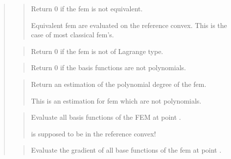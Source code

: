 \documentclass[a4paper,11pt,english]{sphinxmanual}
\begin{document}
\begin{quote}
\sphinxAtStartPar
{}
\begin{quote}

\sphinxAtStartPar
Return 0 if the fem is not equivalent.

\sphinxAtStartPar
Equivalent fem are evaluated on the reference convex. This is
the case of most classical fem’s.
\end{quote}

\sphinxAtStartPar
{}
\begin{quote}

\sphinxAtStartPar
Return 0 if the fem is not of Lagrange type.
\end{quote}

\sphinxAtStartPar
{}
\begin{quote}

\sphinxAtStartPar
Return 0 if the basis functions are not polynomials.
\end{quote}

\sphinxAtStartPar
{}
\begin{quote}

\sphinxAtStartPar
Return an estimation of the polynomial degree of the fem.

\sphinxAtStartPar
This is an estimation for fem which are not polynomials.
\end{quote}

\sphinxAtStartPar
{}
\begin{quote}

\sphinxAtStartPar
Evaluate all basis functions of the FEM at point .

\sphinxAtStartPar
{} is supposed to be in the reference convex!
\end{quote}

\sphinxAtStartPar
{}
\begin{quote}

\sphinxAtStartPar
Evaluate the gradient of all base functions of the fem at point .


\end{quote}
\end{quote}
\end{document}

